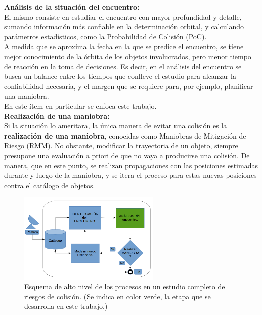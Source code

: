 {\bf{An\'alisis de la situaci\'on del encuentro: }}\\
El mismo consiste en estudiar el encuentro con mayor profundidad y detalle, sumando informaci\'on m\'as confiable en la determinaci\'on orbital, y calculando par\'ametros estad\'isticos, como la Probabilidad de Colisi\'on (PoC).\\
A medida que se aproxima la fecha en la que se predice el encuentro, se tiene mejor conocimiento de la \'orbita de los objetos involucrados, pero menor tiempo de reacci\'on en la toma de decisiones. Es decir, en el an\'alisis del encuentro se busca un balance entre los tiempos que conlleve el estudio para alcanzar la confiabilidad necesaria, y el margen que se requiere para, por ejemplo, planificar una maniobra.\\
En este \'item en particular se enfoca este trabajo.\\

{\bf{Realizaci\'on de una maniobra:}}\\
Si la situaci\'on lo ameritara, la \'unica manera de evitar una colisi\'on es la {\bf{realizaci\'on de una maniobra}}, conocidas como Maniobras de Mitigaci\'on de Riesgo (RMM). No obstante, modificar la trayectoria de un objeto, siempre presupone una evaluaci\'on a priori de que no vaya a producirse una colisi\'on. De manera, que en este punto, se realizan propagaciones con las posiciones estimadas durante y luego de la maniobra, y se itera el proceso para estas nuevas posiciones contra el cat\'alogo de objetos.\\ 



\begin{figure}[!h]
  \centering
  \includegraphics[width=0.6\textwidth]{imagenes/estudiocolision}
  \caption[Estudio de Colisi\'on]{Esquema de alto nivel de los procesos en un estudio completo de riesgos de colisi\'on. (Se indica en color verde, la etapa que se desarrolla en este trabajo.)}
  \label{fig:estudiocolision}
\end{figure}


